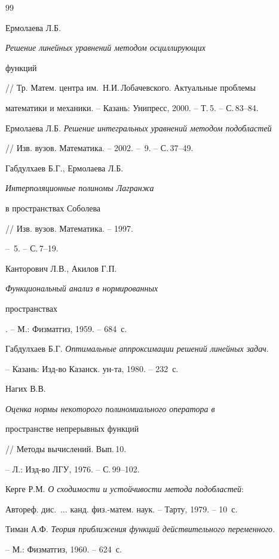 \begin{thebibliography}{99}







Ермолаева Л.Б. {\em Решение линейных уравнений методом осциллирующих


функций} // Тр. Матем. центра им.~Н.И.\,Лобачевского. Актуальные проблемы 


математики и механики. -- Казань: Унипресс, 2000. -- Т.\,5. -- С.\,83--84.




Ермолаева Л.Б. {\em Решение интегральных уравнений методом подобластей}


// Изв. вузов. Математика. -- 2002. -- \No\,9. -- С.\,37--49.




Габдулхаев Б.Г., Ермолаева Л.Б. {\em Интерполяционные полиномы Лагранжа 


в пространствах Соболева} // Изв. вузов. Математика. -- 1997.


-- \No\,5. -- С.\,7--19.




Канторович Л.В., Акилов Г.П. {\em Функциональный анализ в нормированных


пространствах}. -- М.: Физматгиз, 1959. -- 684~с.




Габдулхаев Б.Г. {\em Оптимальные аппроксимации решений линейных задач}.


-- Казань: Изд-во Казанск. ун-та, 1980. -- 232~с.




Нагих В.В. {\em Оценка нормы некоторого полиномиального оператора в


пространстве непрерывных функций} // Методы вычислений. Вып.\,10.


-- Л.: Изд-во ЛГУ, 1976. -- С.\,99--102.




Керге Р.М. {\em О сходимости и устойчивости метода подобластей}:


Автореф. дис.~$\dotsc$ канд. физ.-матем. наук. -- Тарту, 1979. -- 10~с.




Тиман А.Ф. {\em Теория приближения функций действительного переменного}.


-- М.: Физматгиз, 1960. -- 624~с.





\end{thebibliography}
